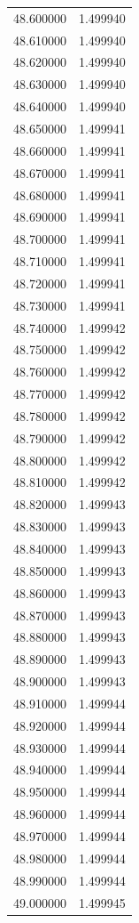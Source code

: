 \begin{tabular}{rr}
48.600000 & 1.499940 \\
48.610000 & 1.499940 \\
48.620000 & 1.499940 \\
48.630000 & 1.499940 \\
48.640000 & 1.499940 \\
48.650000 & 1.499941 \\
48.660000 & 1.499941 \\
48.670000 & 1.499941 \\
48.680000 & 1.499941 \\
48.690000 & 1.499941 \\
48.700000 & 1.499941 \\
48.710000 & 1.499941 \\
48.720000 & 1.499941 \\
48.730000 & 1.499941 \\
48.740000 & 1.499942 \\
48.750000 & 1.499942 \\
48.760000 & 1.499942 \\
48.770000 & 1.499942 \\
48.780000 & 1.499942 \\
48.790000 & 1.499942 \\
48.800000 & 1.499942 \\
48.810000 & 1.499942 \\
48.820000 & 1.499943 \\
48.830000 & 1.499943 \\
48.840000 & 1.499943 \\
48.850000 & 1.499943 \\
48.860000 & 1.499943 \\
48.870000 & 1.499943 \\
48.880000 & 1.499943 \\
48.890000 & 1.499943 \\
48.900000 & 1.499943 \\
48.910000 & 1.499944 \\
48.920000 & 1.499944 \\
48.930000 & 1.499944 \\
48.940000 & 1.499944 \\
48.950000 & 1.499944 \\
48.960000 & 1.499944 \\
48.970000 & 1.499944 \\
48.980000 & 1.499944 \\
48.990000 & 1.499944 \\
49.000000 & 1.499945 \\

\end{tabular}
